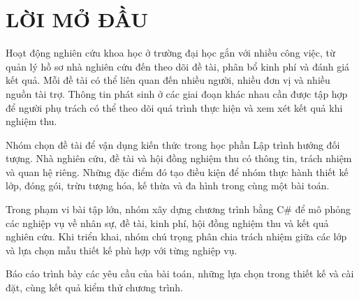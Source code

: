 \section*{\centering LỜI MỞ ĐẦU}

Hoạt động nghiên cứu khoa học ở trường đại học gắn với nhiều công việc, từ quản lý hồ sơ nhà nghiên cứu đến theo dõi đề tài, phân bổ kinh phí và đánh giá kết quả. Mỗi đề tài có thể liên quan đến nhiều người, nhiều đơn vị và nhiều nguồn tài trợ. Thông tin phát sinh ở các giai đoạn khác nhau cần được tập hợp để người phụ trách có thể theo dõi quá trình thực hiện và xem xét kết quả khi nghiệm thu.

Nhóm chọn đề tài \textit{\ReportTitle} để vận dụng kiến thức trong học phần Lập trình hướng đối tượng. Nhà nghiên cứu, đề tài và hội đồng nghiệm thu có thông tin, trách nhiệm và quan hệ riêng. Những đặc điểm đó tạo điều kiện để nhóm thực hành thiết kế lớp, đóng gói, trừu tượng hóa, kế thừa và đa hình trong cùng một bài toán.

Trong phạm vi bài tập lớn, nhóm xây dựng chương trình bằng C\# để mô phỏng các nghiệp vụ về nhân sự, đề tài, kinh phí, hội đồng nghiệm thu và kết quả nghiên cứu. Khi triển khai, nhóm chú trọng phân chia trách nhiệm giữa các lớp và lựa chọn mẫu thiết kế phù hợp với từng nghiệp vụ.

Báo cáo trình bày các yêu cầu của bài toán, những lựa chọn trong thiết kế và cài đặt, cùng kết quả kiểm thử chương trình.
